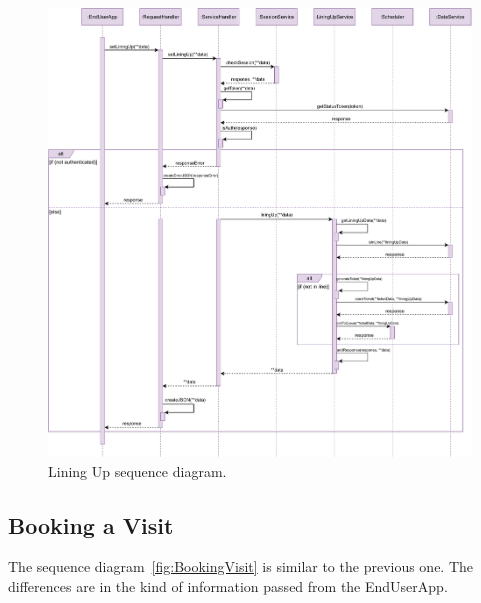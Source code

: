\begin{figure}[H]
    \centering
    \includegraphics[width=1.0\textwidth]{images/liningUp_sequence_diagram.pdf}
    \caption{Lining Up sequence diagram.}\label{fig:LiningUp}
\end{figure}

\subsection{Booking a Visit}

The sequence diagram~\ref{fig:BookingVisit} is similar to the previous one.
The differences are in the kind of information passed from the EndUserApp.

